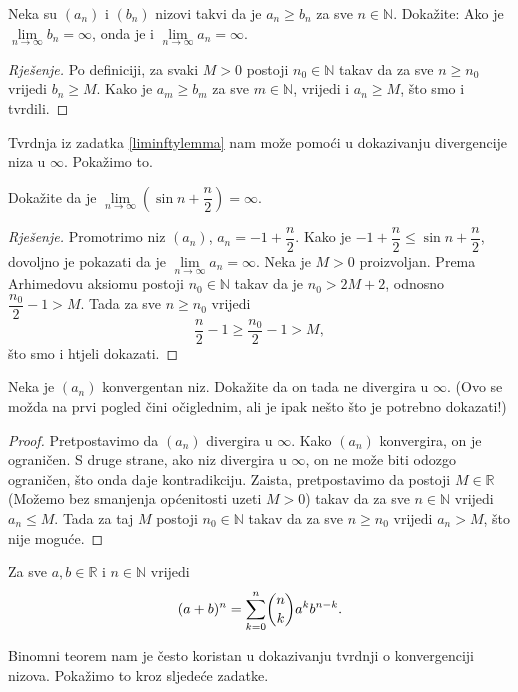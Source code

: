 \begin{exercise}
\label{liminftylemma}
Neka su $(a_n)$ i $(b_n)$ nizovi takvi da je $a_n\geq b_n$ za sve $n\in \mathbb{N}$. Dokažite: Ako je $\lim\limits_{n\to \infty}{b_n}=\infty$, onda je i $\lim\limits_{n\to \infty}{a_n}=\infty$.
\end{exercise}
\begin{proof}[Rješenje]
Po definiciji, za svaki $M>0$ postoji $n_0\in \mathbb{N}$ takav da za sve $n\geq n_0$ vrijedi $b_n\geq M$. Kako je $a_m\geq b_m$ za sve $m\in \mathbb{N}$, vrijedi i $a_n\geq M$, što smo i tvrdili.
\end{proof}
Tvrdnja iz zadatka \ref{liminftylemma} nam može pomoći u dokazivanju divergencije niza u $\infty$. Pokažimo to.
\begin{exercise}
Dokažite da je $\lim\limits_{n\to \infty}\left(\sin{n}+\dfrac{n}{2}\right)=\infty$.
\end{exercise}
\begin{proof}[Rješenje]
Promotrimo niz $(a_n)$, $a_n=-1+\dfrac{n}{2}$. Kako je $-1+\dfrac{n}{2}\leq \sin{n}+\dfrac{n}{2}$, dovoljno je pokazati da je $\lim\limits_{n\to \infty}{a_n}=\infty$. Neka je $M>0$ proizvoljan. Prema Arhimedovu aksiomu postoji $n_0\in \mathbb{N}$ takav da je $n_0>2M+2$, odnosno $\dfrac{n_0}{2}-1>M$. Tada za sve $n\geq n_0$ vrijedi 
$$\dfrac{n}{2}-1\geq \dfrac{n_0}{2}-1>M,$$
što smo i htjeli dokazati.
\end{proof}
\begin{exercise}
Neka je $(a_n)$ konvergentan niz. Dokažite da on tada ne divergira u $\infty$. (Ovo se možda na prvi pogled čini očiglednim, ali je ipak nešto što je potrebno dokazati!)
\end{exercise}
\begin{proof}
Pretpostavimo da $(a_n)$ divergira u $\infty$. Kako $(a_n)$ konvergira, on je ograničen. S druge strane, ako niz divergira u $\infty$, on ne može biti odozgo ograničen, što onda daje kontradikciju. Zaista, pretpostavimo da postoji $M\in \mathbb{R}$ (Možemo bez smanjenja općenitosti uzeti $M>0$) takav da za sve $n\in \mathbb{N}$ vrijedi $a_n\leq M$. Tada za taj $M$ postoji $n_0\in \mathbb{N}$ takav da za sve $n\geq n_0$ vrijedi $a_n>M$, što nije moguće.
\end{proof}
\begin{remark}
Za sve $a, b\in \mathbb{R}$ i $n\in \mathbb{N}$ vrijedi
$$(a+b)^n=\dsum_{k=0}^n{\binom{n}{k}a^kb^{n-k}}.$$
\end{remark}
Binomni teorem nam je često koristan u dokazivanju tvrdnji o konvergenciji nizova. Pokažimo to kroz sljedeće zadatke.

